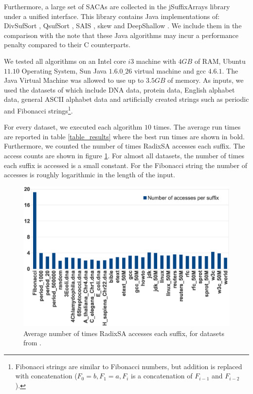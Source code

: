 Furthermore, a large set of SACAs are collected in the jSuffixArrays library \cite{JSA} 
under a unified interface. This library contains Java implementations of: DivSufSort \cite{DivSufSort} , 
QsufSort \cite{LaSa07}, SAIS \cite{NZC09}, skew \cite{KaSa03} and DeepShallow
\cite{MaFe04}. We include them in the comparison with the note that these 
Java algorithms may incur a performance penalty compared to their C counterparts. 

We tested all algorithms on an Intel core $i3$ machine with
$4GB$ of RAM, Ubuntu $11.10$ Operating System, Sun Java $1.6.0\_26$ virtual
machine and gcc $4.6.1$. The Java Virtual Machine was allowed to use up to $3.5GB$
of memory. As inputs, we used the datasets of \cite{ScSt07} which
include DNA data, protein data, English alphabet data, general ASCII alphabet data and
artificially created strings such as periodic and Fibonacci
strings\footnote{Fibonacci strings are similar to Fibonacci numbers, but addition is replaced with concatenation ($F_0=b, F_1=a, F_i$ is a concatenation of $F_{i-1}$ and $F_{i-2}$).}.

For every dataset, we executed each algorithm $10$ times. The average run times
are reported in table \ref{table_results} where the best run times are
shown in bold.  Furthermore, we counted the number of times RadixSA accesses each suffix.
The access counts are shown in figure \ref{fig_avg_access}. For almost all datasets, the number
of times each suffix is accessed is a small constant. For the Fibonacci string the
number of accesses is roughly logarithmic in the length of the input. 

\begin{figure}
\caption{Average number of times RadixSA accesses each suffix, for datasets from
\cite{ScSt07}.}\label{fig_avg_access}
\includegraphics[scale=0.4]{avgAccessPerSuffix.eps}
\end{figure}


